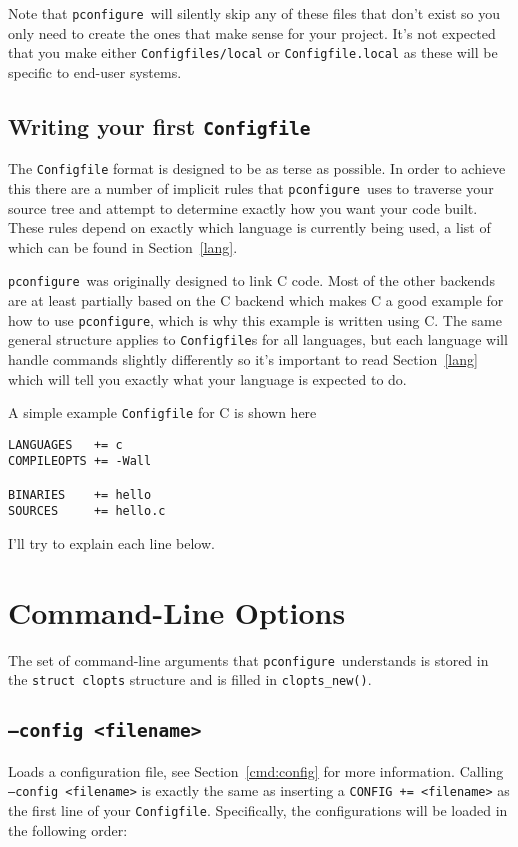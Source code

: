 \documentclass{article}
\newcommand{\pconfigure}{\texttt{pconfigure}}
\begin{document}
Note that \pconfigure\ will silently skip any of these files that
don't exist so you only need to create the ones that make sense for
your project.  It's not expected that you make either
\texttt{Configfiles/local} or \texttt{Configfile.local} as these will
be specific to end-user systems.

\subsection{Writing your first \texttt{Configfile}}

The \texttt{Configfile} format is designed to be as terse as possible.
In order to achieve this there are a number of implicit rules that
\pconfigure\ uses to traverse your source tree and attempt to
determine exactly how you want your code built.  These rules depend on
exactly which language is currently being used, a list of which can be
found in Section~\ref{lang}.

\pconfigure\ was originally designed to link C code.  Most of the
other backends are at least partially based on the C backend which
makes C a good example for how to use \pconfigure, which is why this
example is written using C.  The same general structure applies to
\texttt{Configfile}s for all languages, but each language will handle
commands slightly differently so it's important to read
Section~\ref{lang} which will tell you exactly what your language is
expected to do.

A simple example \texttt{Configfile} for C is shown here
\begin{verbatim}
LANGUAGES   += c
COMPILEOPTS += -Wall

BINARIES    += hello
SOURCES     += hello.c
\end{verbatim}
I'll try to explain each line below.

\section{Command-Line Options \label{cl}}

The set of command-line arguments that \pconfigure\ understands is
stored in the \texttt{struct clopts} structure and is filled in
\texttt{clopts\_new()}.

\subsection{\texttt{--config <filename>}}

Loads a configuration file, see Section~\ref{cmd:config} for more
information.  Calling \texttt{--config <filename>} is exactly the same
as inserting a \texttt{CONFIG += <filename>} as the first line of your
\texttt{Configfile}.  Specifically, the configurations will be loaded
in the following order:
\end{document}
